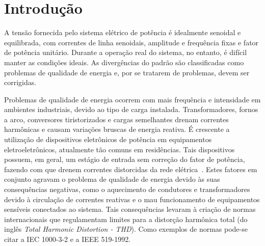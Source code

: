 
\chapter{Introdução}\label{introducao}


	A tensão fornecida pelo sistema elétrico de potência é idealmente senoidal e equilibrada, com correntes de linha senoidais, amplitude e frequência fixas e fator de potência unitário. Durante a operação real do sistema, no entanto, é difícil manter as condições ideais. As divergências do padrão são classificadas como problemas de qualidade de energia e, por se tratarem de problemas, devem ser corrigidas.

	Problemas de qualidade de energia ocorrem com mais frequência e intensidade em ambientes industriais, devido ao tipo de carga instalada. Transformadores, fornos a arco, conversores tiristorizados e cargas semelhantes drenam correntes harmônicas e causam variações bruscas de energia reativa. É crescente a utilização de dispositivos eletrônicos de potência em equipamentos eletroeletrônicos, atualmente tão comuns em residências. Tais dispositivos possuem, em geral, um estágio de entrada sem correção do fator de potência, fazendo com que drenem correntes distorcidas da rede elétrica~\cite{ref:MANSOOR}. Estes fatores em conjunto agravam o problema de qualidade de energia devido às suas consequências negativas, como	o aquecimento de condutores e transformadores devido à circulação de correntes reativas e o mau funcionamento de equipamentos sensíveis conectados ao sistema.	Tais consequências levaram à criação de normas internacionais que regulamentam limites para a distorção harmônica total (do inglês \emph{Total Harmonic Distortion - THD}). Como exemplos de normas pode-se citar a IEC 1000-3-2 e a IEEE 519-1992.

